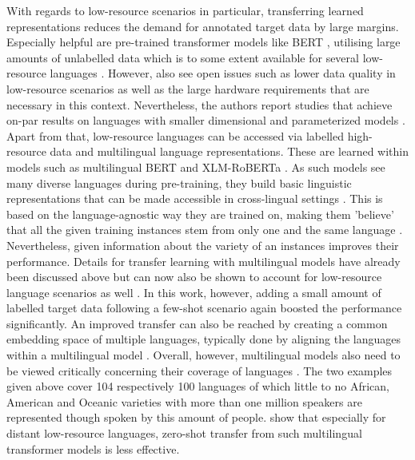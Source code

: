 \documentclass[11pt,a4paper,twoside,openright]{scrbook}
\begin{document}
With regards to low-resource scenarios in particular, transferring learned representations reduces the demand for annotated target data by large margins. Especially helpful are pre-trained transformer models \citep{vaswani_attention} like BERT \citep{devlin-etal-2019-bert}, utilising large amounts of unlabelled data which is to some extent available for several low-resource languages \citep{Zampieri_Nakov_Scherrer_2020}. However, \citet{hedderich-etal-2021-survey} also see open issues such as lower data quality in low-resource scenarios as well as the large hardware requirements that are necessary in this context. Nevertheless, the authors report studies that achieve on-par results on languages with smaller dimensional and parameterized models \citep{vanbiljon2020depthlowresource, schick-schutze-2021-just}. Apart from that, low-resource languages can be accessed via labelled high-resource data and multilingual language representations. These are learned within models such as multilingual BERT \citep{devlin-etal-2019-bert} and XLM-RoBERTa \citep{conneau-etal-2020-unsupervised}. As such models see many diverse languages during pre-training, they build basic linguistic representations that can be made accessible in cross-lingual settings \citep{hedderich-etal-2021-survey}. This is based on the language-agnostic way they are trained on, making them 'believe' that all the given training instances stem from only one and the same language \citep{Zampieri_Nakov_Scherrer_2020}. Nevertheless, given information about the variety of an instances improves their performance. Details for transfer learning with multilingual models have already been discussed above but can now also be shown to account for low-resource language scenarios as well \citep{hedderich-etal-2020-transfer}. In this work, however, adding a small amount of labelled target data following a few-shot scenario again boosted the performance significantly. An improved transfer can also be reached by creating a common embedding space of multiple languages, typically done by aligning the languages within a multilingual model \citep{Ruder_2019}. Overall, however, multilingual models also need to be viewed critically concerning their coverage of languages \citep{hedderich-etal-2021-survey}. The two examples given above cover 104 respectively 100 languages of which little to no African, American and Oceanic varieties with more than one million speakers are represented though spoken by this amount of people. \citep{lauscher-etal-2020-zero} show that especially for distant low-resource languages, zero-shot transfer from such multilingual transformer models is less effective.
\end{document}
